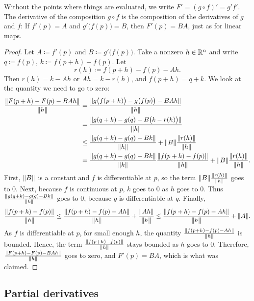 Without the points where things are evaluated, we write
$F' = {(g \circ f)}' = g' f'$.
The derivative of the composition $g \circ f$
is the composition of the derivatives of $g$ and $f$:
If $f'(p) = A$ and $g'\bigl(f(p)\bigr) = B$, then $F'(p) = BA$,
just as for linear maps.

\begin{proof}
Let $A \coloneqq f'(p)$ and $B \coloneqq g'\bigl(f(p)\bigr)$.  Take a nonzero $h \in {\mathbb{R}}^n$
and write $q \coloneqq f(p)$, $k \coloneqq f(p+h)-f(p)$.  Let
\begin{equation*}
r(h) \coloneqq f(p+h)-f(p) - A h . %
\end{equation*}
Then $r(h) = k-Ah$ or $Ah = k-r(h)$, and $f(p+h) = q+k$.
We look at the quantity we need to go
to zero:
\begin{equation*}
\begin{split}
\frac{\lVert {F(p+h)-F(p) - BAh} \rVert}{\lVert {h} \rVert}
& =
\frac{\lVert {g\bigl(f(p+h)\bigr)-g\bigl(f(p)\bigr) - BAh} \rVert}{\lVert {h} \rVert}
\\
& =
\frac{\lVert {g(q+k)-g(q) - B\bigl(k-r(h)\bigr)} \rVert}{\lVert {h} \rVert}
\\
& \leq
\frac
{\lVert {g(q+k)-g(q) - Bk} \rVert}
{\lVert {h} \rVert}
+
\lVert {B} \rVert
\frac
{\lVert {r(h)} \rVert}
{\lVert {h} \rVert}
\\
& =
\frac
{\lVert {g(q+k)-g(q) - Bk} \rVert}
{\lVert {k} \rVert}
\frac
{\lVert {f(p+h)-f(p)} \rVert}
{\lVert {h} \rVert}
+
\lVert {B} \rVert
\frac
{\lVert {r(h)} \rVert}
{\lVert {h} \rVert} .
\end{split}
\end{equation*}
First, $\lVert {B} \rVert$ is a constant and $f$ is differentiable at $p$,
so
the term $\lVert {B} \rVert\frac{\lVert {r(h)} \rVert}{\lVert {h} \rVert}$ goes to 0.
Next, because $f$ is continuous at $p$,
$k$ goes to 0 as $h$ goes to 0.
Thus
$\frac
{\lVert {g(q+k)-g(q) - Bk} \rVert}
{\lVert {k} \rVert}$ goes to 0, because $g$ is differentiable at $q$.
Finally,
\begin{equation*}
\frac
{\lVert {f(p+h)-f(p)} \rVert}
{\lVert {h} \rVert}
\leq
\frac
{\lVert {f(p+h)-f(p)-Ah} \rVert}
{\lVert {h} \rVert}
+
\frac
{\lVert {Ah} \rVert}
{\lVert {h} \rVert}
\leq
\frac
{\lVert {f(p+h)-f(p)-Ah} \rVert}
{\lVert {h} \rVert}
+
\lVert {A} \rVert .
\end{equation*}
As $f$ is differentiable at $p$,
for small enough $h$, the quantity
$\frac{\lVert {f(p+h)-f(p)-Ah} \rVert}{\lVert {h} \rVert}$ is bounded.  Hence, the
term
$
\frac
{\lVert {f(p+h)-f(p)} \rVert}
{\lVert {h} \rVert}
$
stays bounded as $h$ goes to 0.  Therefore, 
$\frac{\lVert {F(p+h)-F(p) - BAh} \rVert}{\lVert {h} \rVert}$ goes to zero, and
$F'(p) = BA$, which is what was claimed.
\end{proof}

\subsection{Partial derivatives}

